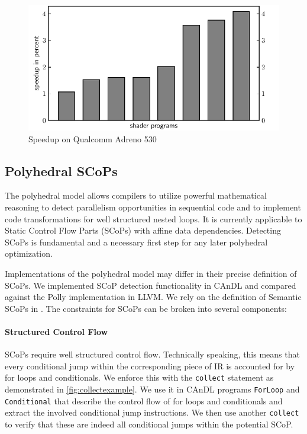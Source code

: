 \begin{figure}[ht]
\centering
\includegraphics[width=\linewidth]{figures/qualcomm_plot.pdf}
\caption{Speedup on Qualcomm Adreno 530}
\label{fig:qualcommspeedup}
\end{figure}

\subsection{Polyhedral SCoPs}

    The polyhedral model allows compilers to utilize powerful mathematical
    reasoning to detect parallelism opportunities in sequential code and to
    implement code transformations for well structured nested
    loops.
    It is currently applicable to Static Control Flow Parts (SCoPs) with affine
    data dependencies.
    Detecting SCoPs is fundamental and a necessary first step for any later
    polyhedral optimization.

    Implementations of the polyhedral model may differ in their precise
    definition of SCoPs.
    We implemented SCoP detection functionality in CAnDL and compared against
    the Polly implementation in LLVM.
    We rely on the definition of Semantic SCoPs in \citet{Lengauer2012Polly}.
    The constraints for SCoPs can be broken into several components:

    \paragraph{Structured Control Flow}
    SCoPs require well structured control flow.
    Technically speaking, this means that every conditional jump within the
    corresponding piece of IR is accounted for by for loops and conditionals.
    We enforce this with the \texttt{collect} statement as demonstrated in
    \autoref{fig:collectexample}.
    We use it in CAnDL programs \texttt{ForLoop} and
    \texttt{Conditional} that describe the control flow of for loops and
    conditionals and extract the involved conditional jump instructions.
    We then use another \texttt{collect} to verify that these are indeed all
    conditional jumps within the potential SCoP.

